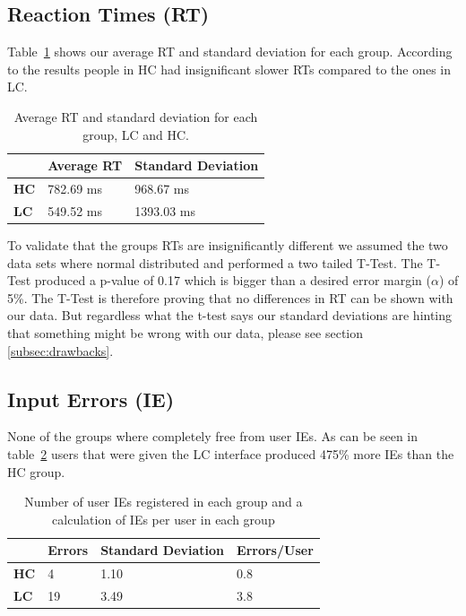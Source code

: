 \documentclass[runningheads,a4paper]{llncs}
\begin{document}
\subsection{Reaction Times (RT)}
Table~\ref{tab:groupRT} shows our average RT and standard deviation for each group. According to the results people in HC had insignificant slower RTs compared to the ones in LC.

\begin{table}[]
	\centering
	\label{tab:groupRT}
	\setlength{\tabcolsep}{1em}
	\setlength\extrarowheight{1em}
	\begin{tabular}{l|l|l}
		\textbf{} & \textbf{Average RT} & \textbf{Standard Deviation} \\ \hline
		\textbf{HC} & 782.69 ms & 968.67 ms \\ \hline
		\textbf{LC} & 549.52 ms & 1393.03 ms
	\end{tabular}
	\caption{Average RT and standard deviation for each group, LC and HC.}
\end{table}

To validate that the groups RTs are insignificantly different we assumed the two data sets where normal distributed and performed a two tailed T-Test. The T-Test produced a p-value of 0.17 which is bigger than a desired error margin ($\alpha$) of 5\%. The T-Test is therefore proving that no differences in RT can be shown with our data. But regardless what the t-test says our standard deviations are hinting that something might be wrong with our data, please see section \ref{subsec:drawbacks}.

\subsection{Input Errors (IE)}
None of the groups where completely free from user IEs. As can be seen in table~\ref{tab:userIE} users that were given the LC interface produced 475\% more IEs than the HC group.

\begin{table}[]
	\centering
	\label{tab:userIE}
	\setlength{\tabcolsep}{1em}
	\setlength\extrarowheight{1em}
	\begin{tabular}{l|l|l|l}
		\textbf{} & \textbf{Errors} & \textbf{Standard Deviation} & \textbf{Errors/User} \\ \hline
		\textbf{HC} & 4 & 1.10 & 0.8 \\ \hline
		\textbf{LC} & 19 & 3.49 & 3.8
	\end{tabular}
	\caption{Number of user IEs registered in each group and a calculation of IEs per user in each group}
\end{table}
\end{document}
